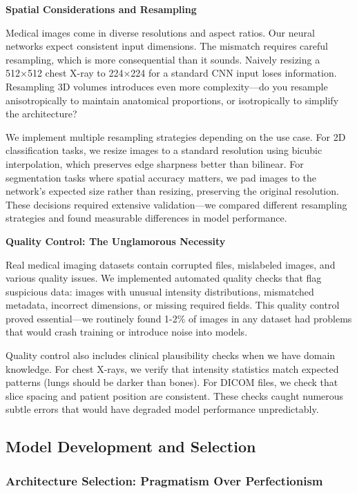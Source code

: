 \documentclass[12pt,a4paper]{article}
\begin{document}
\textbf{Spatial Considerations and Resampling}

Medical images come in diverse resolutions and aspect ratios. Our neural networks expect consistent input dimensions. The mismatch requires careful resampling, which is more consequential than it sounds. Naively resizing a 512×512 chest X-ray to 224×224 for a standard CNN input loses information. Resampling 3D volumes introduces even more complexity—do you resample anisotropically to maintain anatomical proportions, or isotropically to simplify the architecture?

We implement multiple resampling strategies depending on the use case. For 2D classification tasks, we resize images to a standard resolution using bicubic interpolation, which preserves edge sharpness better than bilinear. For segmentation tasks where spatial accuracy matters, we pad images to the network's expected size rather than resizing, preserving the original resolution. These decisions required extensive validation—we compared different resampling strategies and found measurable differences in model performance.

\textbf{Quality Control: The Unglamorous Necessity}

Real medical imaging datasets contain corrupted files, mislabeled images, and various quality issues. We implemented automated quality checks that flag suspicious data: images with unusual intensity distributions, mismatched metadata, incorrect dimensions, or missing required fields. This quality control proved essential—we routinely found 1-2\% of images in any dataset had problems that would crash training or introduce noise into models.

Quality control also includes clinical plausibility checks when we have domain knowledge. For chest X-rays, we verify that intensity statistics match expected patterns (lungs should be darker than bones). For DICOM files, we check that slice spacing and patient position are consistent. These checks caught numerous subtle errors that would have degraded model performance unpredictably.

\subsection{Model Development and Selection}

\subsubsection{Architecture Selection: Pragmatism Over Perfectionism}
\end{document}
